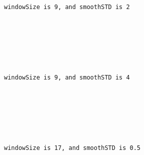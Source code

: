 \documentclass[11pt]{article}
\begin{document}
    \begin{center}
    \end{center}
    { \hspace*{\fill} \\}
    
    \begin{Verbatim}[commandchars=\\\{\}]


windowSize is 9, and smoothSTD is 2

    \end{Verbatim}

    \begin{center}
    \end{center}
    { \hspace*{\fill} \\}
    
    \begin{center}
    \end{center}
    { \hspace*{\fill} \\}
    
    \begin{Verbatim}[commandchars=\\\{\}]


windowSize is 9, and smoothSTD is 4

    \end{Verbatim}

    \begin{center}
    \end{center}
    { \hspace*{\fill} \\}
    
    \begin{center}
    \end{center}
    { \hspace*{\fill} \\}
    
    \begin{Verbatim}[commandchars=\\\{\}]


windowSize is 17, and smoothSTD is 0.5

    \end{Verbatim}
\end{document}
